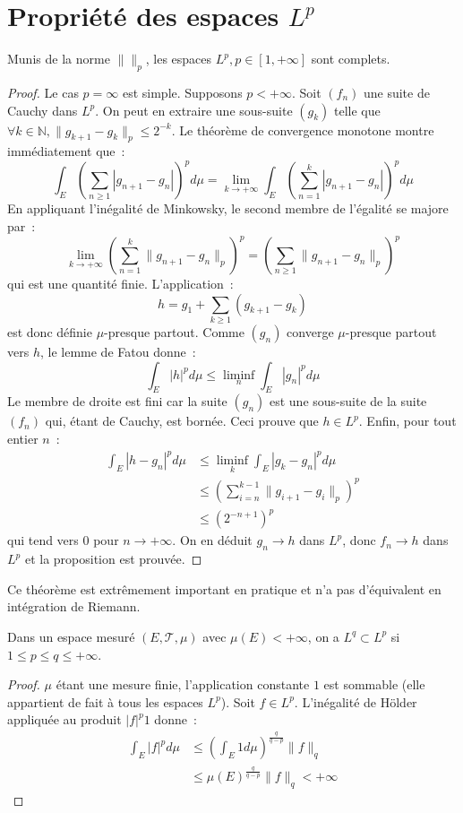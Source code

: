 \section{Propriété des espaces $L^p$}
\begin{mandatory}
\begin{theorem}
Munis de la norme $\|\|_p$, les espaces $L^p, p\in [1,+\infty]$ sont complets.
\end{theorem}
\end{mandatory}
\begin{proof}
Le cas $p=\infty$ est simple. Supposons $p < +\infty$. Soit $(f_n)$
une suite de Cauchy dans $L^p$. On peut en extraire une sous-suite
$(g_k)$ telle que $\forall k \in \mathbb{N}, \|g_{k+1}-g_k\|_p \leq
2^{-k}$.
Le théorème de convergence monotone montre immédiatement que~:
\[
\int_E \left ( \sum_{n \geq 1} | g_{n+1} - g_n | \right )^p d
\mu = \lim_{k \to +\infty}  \int_E \left ( \sum_{n=1}^k | g_{n+1} - g_n
| \right )^p d \mu
\]
En appliquant l'inégalité de Minkowsky, le second membre de l'égalité
se majore par~:
\[
\lim_{k \to +\infty}  \left ( \sum_{n=1}^k \| g_{n+1} - g_n \|_p
\right )^p = \left ( \sum_{n \geq 1} \| g_{n+1} - g_n \|_p
\right )^p
\]
qui est une quantité finie.
L'application~:
\[
h = g_1 + \sum_{k\geq 1} (g_{k+1} - g_k)
\]
est donc définie $\mu$-presque partout. Comme $(g_n)$ converge
$\mu$-presque partout vers $h$, le lemme de Fatou donne~:
\[
\int_E |h|^p d \mu \leq \liminf_n \int_E |g_n|^p d \mu 
\]
Le membre de droite est fini car la suite $(g_n)$ est une sous-suite
de la suite $(f_n)$ qui, étant de Cauchy, est bornée.
Ceci prouve que $h \in L^p$. Enfin, pour tout entier $n$~:
\begin{align*}
\int_E | h - g_n|^p d \mu & \leq \liminf_k \int_E |g_k -g_n|^p d \mu
\\
& \leq \left ( \sum_{i=n}^{k-1} \| g_{i+1} - g_i \|_p \right )^p \\
& \leq
\left (2^{-n+1} \right)^p
\end{align*}
qui tend vers 0 pour $n \to +\infty$. On en déduit $g_n \to h$ dans
$L^p$, donc $f_n \to h$ dans $L^p$ et la proposition est prouvée.
\end{proof}
Ce théorème est extrêmement important en pratique et n'a pas
d'équivalent en intégration de Riemann. 
\begin{prop}\label{ch3:p1}
Dans un espace mesuré $(E, \mathcal{T}, \mu)$ avec $\mu(E) < +\infty$,
on a $L^q \subset L^p$ si $1 \leq p \leq q \leq +\infty$.
\end{prop}
\begin{proof}
$\mu$ étant une mesure finie, l'application constante $1$ est sommable
(elle appartient de fait à tous les espaces $L^p$). Soit $f \in
L^p$. L'inégalité de Hölder appliquée au produit $|f|^{p} 1$ donne~:
\begin{align*}
\int_E |f|^p d \mu & \leq \left ( \int_E 1 d \mu \right ) ^{\frac{q}{q-p}}
\|f\|_q \\ & \leq \mu(E)^{\frac{q}{q-p}} \|f\|_q < +\infty
\end{align*}
\end{proof}
